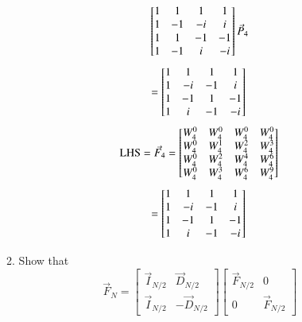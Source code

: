 \documentclass[journal,12pt,twocolumn]{IEEEtran}
\renewcommand\thesection{\arabic{section}}
\begin{document}
\begin{enumerate}[label=\thesection.\arabic*]
\begin{enumerate}[label=\arabic*.,ref=\thesection.\theenumi]
\begin{equation}
\begin{bmatrix}
			1	&	1	&	1	&	1\\
			1	&	-1	&	-i	&	i\\
			1	&	1	&	-1	&	-1\\
			1	&	-1	&	i	&	-i\\
		\end{bmatrix}\vec{P}_{4}\\
	\end{equation}
	\begin{equation}
		=\begin{bmatrix}
			1	&	1	&	1	&	1\\
			1	&	-i	&	-1	&	i\\
			1	&	-1	&	1	&	-1\\
			1	&	i	&	-1	&	-i\\
		\end{bmatrix}\\
	\end{equation}
	\begin{equation}
		\text{LHS} = \vec{F}_{4}
		= \begin{bmatrix}
			W_{4}^0	&	W_{4}^0	&	W_{4}^0	&	W_{4}^0\\
			W_{4}^0	&	W_{4}^1	&	W_{4}^2	&	W_{4}^3\\
			W_{4}^0	&	W_{4}^2	&	W_{4}^4	&	W_{4}^6\\
			W_{4}^0	&	W_{4}^3	&	W_{4}^6	&	W_{4}^9\\
		\end{bmatrix}\\
	\end{equation}
	\begin{equation}
		= \begin{bmatrix}
			1	&	1	&	1	&	1\\
			1	&	-i	&	-1	&	i\\
			1	&	-1	&	1	&	-1\\
			1	&	i	&	-1	&	-i\\
		\end{bmatrix}\\
	\end{equation}
	\item Show that 
	\begin{equation}
		\vec{F}_{N}=
		\begin{bmatrix}
			\vec{I}_{N/2} & \vec{D}_{N/2} \\
			\vec{I}_{N/2} & -\vec{D}_{N/2}
		\end{bmatrix}
		\begin{bmatrix}
			\vec{F}_{N/2} & 0 \\
			0 & \vec{F}_{N/2}
		\end{bmatrix}

\end{equation}
\end{enumerate}
\end{enumerate}
\end{document}
